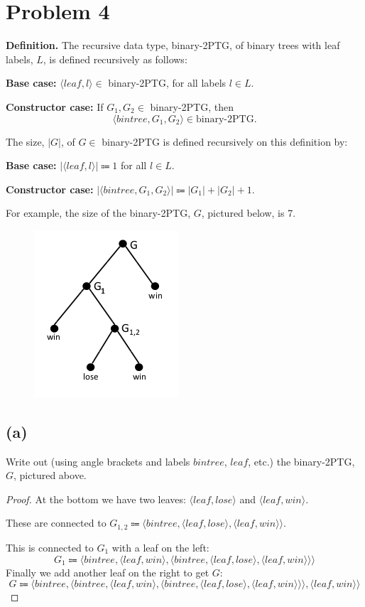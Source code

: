 \documentclass[14pt]{extarticle}
\begin{document}
\section{Problem 4}
{\bf Definition.} The recursive data type, binary-2PTG, of binary trees with leaf labels, $L$, is defined recursively as follows:

{\bf Base case:} $\langle leaf, l\rangle \in$ binary-2PTG, for all labels $l \in L$.

{\bf Constructor case:} If $G_1, G_2 \in$ binary-2PTG, then
$$
\langle bintree, G_1, G_2\rangle \in \text{binary-2PTG.}
$$

The size, $|G|$, of $G \in$ binary-2PTG is defined recursively on this definition by:

{\bf Base case:} $| \langle leaf, l \rangle| \Coloneqq 1$ for all $l \in L$.

{\bf Constructor case:} $|\langle bintree, G_1, G_2\rangle| \Coloneqq |G_1| + |G_2| + 1$.

For example, the size of the binary-2PTG, $G$, pictured below, is 7.
\begin{figure}[ht!]
\centering
\includegraphics[scale=1.0]{bintree.png}
\end{figure}

\subsection{(a)}
Write out (using angle brackets and labels $bintree$, $leaf$, etc.) the binary-2PTG, $G$, pictured above.
\begin{proof}
At the bottom we have two leaves: $\langle leaf, lose\rangle$ and $\langle leaf, win\rangle$.

These are connected to $G_{1,2} \Coloneqq \langle bintree, \langle leaf, lose\rangle, \langle leaf, win\rangle \rangle$.

This is connected to $G_{1}$ with a leaf on the left: 
$$
G_1 \Coloneqq \langle bintree, \langle leaf, win\rangle, \langle bintree, \langle leaf, lose\rangle, \langle leaf, win\rangle \rangle\rangle
$$
Finally we add another leaf on the right to get $G$:
$$
G \Coloneqq \langle bintree, \langle bintree, \langle leaf, win\rangle, \langle bintree, \langle leaf, lose\rangle, \langle leaf, win\rangle \rangle\rangle, \langle leaf, win\rangle\rangle
$$
\end{proof}
\end{document}
